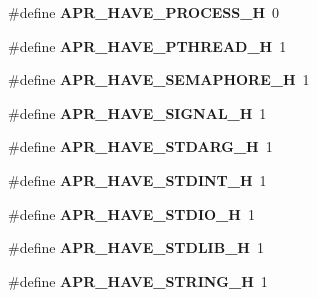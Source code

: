 \begin{DoxyCompactItemize}
\item 
\#define {\bfseries A\+P\+R\+\_\+\+H\+A\+V\+E\+\_\+\+P\+R\+O\+C\+E\+S\+S\+\_\+H}~0\hypertarget{group__apr__platform_ga793aedef0bacf93838d7dc12304e4db1}{}\label{group__apr__platform_ga793aedef0bacf93838d7dc12304e4db1}

\item 
\#define {\bfseries A\+P\+R\+\_\+\+H\+A\+V\+E\+\_\+\+P\+T\+H\+R\+E\+A\+D\+\_\+H}~1\hypertarget{group__apr__platform_ga4275921ca7165eb1b2a3732a40f1b4ec}{}\label{group__apr__platform_ga4275921ca7165eb1b2a3732a40f1b4ec}

\item 
\#define {\bfseries A\+P\+R\+\_\+\+H\+A\+V\+E\+\_\+\+S\+E\+M\+A\+P\+H\+O\+R\+E\+\_\+H}~1\hypertarget{group__apr__platform_ga9080d52aaa134fdefc9a03275c7ac4a6}{}\label{group__apr__platform_ga9080d52aaa134fdefc9a03275c7ac4a6}

\item 
\#define {\bfseries A\+P\+R\+\_\+\+H\+A\+V\+E\+\_\+\+S\+I\+G\+N\+A\+L\+\_\+H}~1\hypertarget{group__apr__platform_ga124a7e90c6c2c74fc54f995e025f694e}{}\label{group__apr__platform_ga124a7e90c6c2c74fc54f995e025f694e}

\item 
\#define {\bfseries A\+P\+R\+\_\+\+H\+A\+V\+E\+\_\+\+S\+T\+D\+A\+R\+G\+\_\+H}~1\hypertarget{group__apr__platform_gaece8f1d70792f3b735fd63cb2233b6a3}{}\label{group__apr__platform_gaece8f1d70792f3b735fd63cb2233b6a3}

\item 
\#define {\bfseries A\+P\+R\+\_\+\+H\+A\+V\+E\+\_\+\+S\+T\+D\+I\+N\+T\+\_\+H}~1\hypertarget{group__apr__platform_ga967df26603971704f396b0ec776ed86f}{}\label{group__apr__platform_ga967df26603971704f396b0ec776ed86f}

\item 
\#define {\bfseries A\+P\+R\+\_\+\+H\+A\+V\+E\+\_\+\+S\+T\+D\+I\+O\+\_\+H}~1\hypertarget{group__apr__platform_ga3b5b55be7a0839f63e0ff1d60a3354ff}{}\label{group__apr__platform_ga3b5b55be7a0839f63e0ff1d60a3354ff}

\item 
\#define {\bfseries A\+P\+R\+\_\+\+H\+A\+V\+E\+\_\+\+S\+T\+D\+L\+I\+B\+\_\+H}~1\hypertarget{group__apr__platform_ga1c8c763f1a54be0d960e0bfa838ee0fb}{}\label{group__apr__platform_ga1c8c763f1a54be0d960e0bfa838ee0fb}

\item 
\#define {\bfseries A\+P\+R\+\_\+\+H\+A\+V\+E\+\_\+\+S\+T\+R\+I\+N\+G\+\_\+H}~1\hypertarget{group__apr__platform_ga0bc16ef0942f44f579dc8027d50f780a}{}\label{group__apr__platform_ga0bc16ef0942f44f579dc8027d50f780a}


\end{DoxyCompactItemize}
